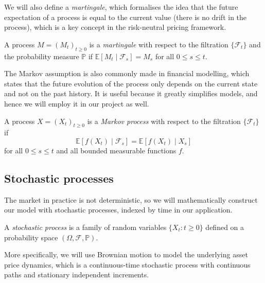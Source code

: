 We will also define a \textit{martingale}, which formalises the idea that the future expectation of a process is equal to the current value (there is no drift in the process), which is a key concept in the risk-neutral pricing framework.

\begin{definition}[Martingale]
    A process $M = (M_t)_{t \ge 0}$ is a \textit{martingale} with respect to the filtration $\{\mathcal F_t\}$ and the probability measure $\mathbb P$ if $\mathbb E[M_t \mid \mathcal F_s] = M_s$ for all $0 \le s \le t$.
\end{definition}

The Markov assumption is also commonly made in financial modelling, which states that the future evolution of the process only depends on the current state and not on the past history. It is useful because it greatly simplifies models, and hence we will employ it in our project as well.

\begin{definition}
    A process $X = (X_t)_{t \ge 0}$ is a \textit{Markov process} with respect to the filtration $\{\mathcal F_t\}$ if
    \begin{equation}
        \mathbb E[f(X_t) \mid \mathcal F_s] = \mathbb E[f(X_t) \mid X_s]
    \end{equation}
    for all $0 \le s \le t$ and all bounded measurable functions $f$.
\label{def:markov_process}
\end{definition}

\subsection{Stochastic processes}

The market in practice is not deterministic, so we will mathematically construct our model with stochastic processes, indexed by time in our application.

\begin{definition}
    A \textit{stochastic process} is a family of random variables $\{X_t : t \ge 0\}$ defined on a probability space $(\Omega, \mathcal F, \mathbb P)$.
\end{definition}

More specifically, we will use Brownian motion to model the underlying asset price dynamics, which is a continuous-time stochastic process with continuous paths and stationary independent increments.

